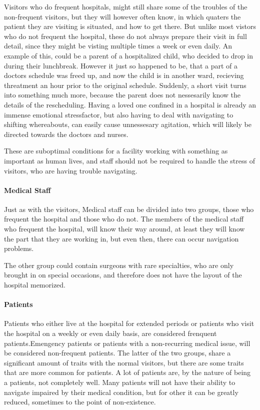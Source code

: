 Visitors who do frequent hospitals, might still share some of the troubles of the non-frequent visitors, but they will however often know, in which quaters the patient they are visiting is situated, and how to get there. But unlike most vistors who do not frequent the hospital, these do not always prepare their visit in full detail, since they might be visting multiple times a week or even daily. An example of this, could be a parent of a hospitalized child, who decided to drop in during their lunchbreak. However it just so happened to be, that a part of a doctors schedule was freed up, and now the child is in another ward, recieving threatment an hour prior to the original schedule. Suddenly, a short visit turns into something much more, because the parent does not nessesarily know the details of the rescheduling. Having a loved one confined in a hospital is already an immense emotional stressfactor, but also having to deal with navigating to shifting whereabouts, can easily cause unnessesary agitation, which will likely be directed towards the doctors and nurses.

These are suboptimal conditions for a facility working with something as important as human lives, and staff should not be required to handle the stress of visitors, who are having trouble navigating.

\paragraph{Medical Staff} %

Just as with the visitors, Medical staff can be divided into two groups, those who frequent the hospital and those who do not. The members of the medical staff who frequent the hospital, will know their way around, at least they will know the part that they are working in, but even then, there can occur navigation problems. 

The other group could contain surgeons with rare specialties, who are only brought in on special occasions, and therefore does not have the layout of the hospital memorized.

\paragraph{Patients} %

Patients who either live at the hospital for extended periods or patients who visit the hospital on a weekly or even daily basis, are considered frenquent patients.Emengency patients or patients with a non-recurring medical issue, will be considered non-frequent patients. The latter of the two groups, share a significant amount of traits with the normal visitors, but there are some traits that are more common for patients.
A lot of patients are, by the nature of being a patients, not completely well. Many patients will not have their ability to navigate impaired by their medical condition, but for other it can be greatly reduced, sometimes to the point of non-existence. 
